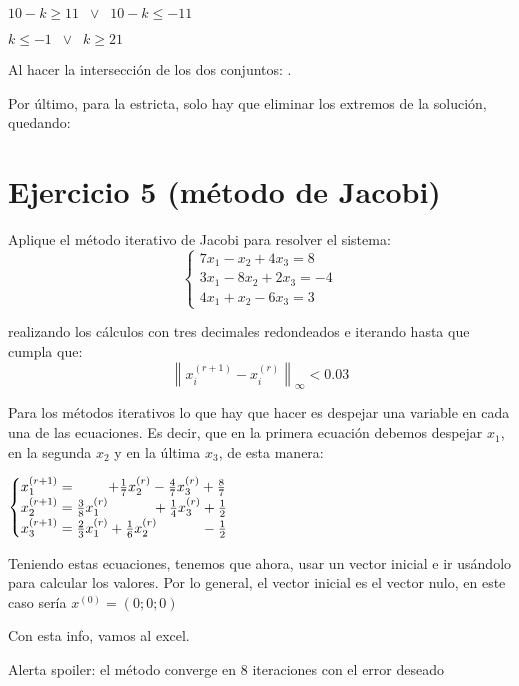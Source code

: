 \documentclass[11pt]{article}
\begin{document}
	$10-k \ge 11 \;\; \lor \;\; 10-k \le -11$
	
	$\boxed{k \le -1 \;\; \lor \;\; k\ge21}$
	
	Al hacer la intersección de los dos conjuntos: \fcolorbox{black}{yellow}{$k \in (-\infty; -1] \cup [21; +\infty)$}.
	
	Por último, para la estricta, solo hay que eliminar los extremos de la solución, quedando: \\ 
	
	\section{Ejercicio 5 (método de Jacobi)}
	Aplique el método iterativo de Jacobi para resolver el sistema:
	$$\begin{cases}
		7x_1-x_2+4x_3=8 \\
		3x_1-8x_2+2x_3=-4 \\ 
		4x_1+x_2-6x_3=3
	\end{cases}$$

	realizando los cálculos con tres decimales redondeados e iterando hasta que cumpla que:
	$$\left\lVert x_{i}^{(r+1)}-x_{i}^{(r)} \right\rVert_\infty < 0.03$$
	
	Para los métodos iterativos lo que hay que hacer es despejar una variable en cada una de las ecuaciones. Es decir, que en la primera ecuación debemos despejar $x_1$, en la segunda $x_2$ y en la última $x_3$, de esta manera:
	
	$\displaystyle \begin{cases}
		x_1^{(r+1)}=\hspace{0.8cm}+\frac{1}{7}x_2^{(r)}-\frac{4}{7}x_3^{(r)}+\frac{8}{7}\\
		x_2^{(r+1)}=\frac{3}{8}x_1^{(r)} \hspace{1.1cm}+\frac{1}{4}x_3^{(r)}+\frac{1}{2}\\
		x_3^{(r+1)}=\frac{2}{3}x_1^{(r)}+\frac{1}{6}x_2^{(r)} \hspace{1.1cm}-\frac{1}{2}
	\end{cases}$

	Teniendo estas ecuaciones, tenemos que ahora, usar un vector inicial e ir usándolo para calcular los valores. Por lo general, el vector inicial es el vector nulo, en este caso sería $x^{(0)}=(0;0;0)$
	
	Con esta info, vamos al excel.

	Alerta spoiler: el método converge en 8 iteraciones con el error deseado
	
\end{document}
